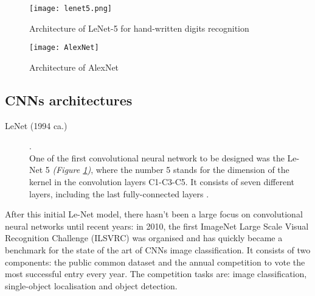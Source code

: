 \documentclass[../main.tex]{subfiles}
\begin{document}
\begin{figure}[!b]
  \centering
  \texttt{[image: lenet5.png]}
  \caption{Architecture of LeNet-5 for hand-written digits recognition \cite{LeCun1998}}
  \label{fig:lenet5}
\end{figure}

\begin{figure}[!b]
  \centering
  \texttt{[image: AlexNet]}
  \caption{Architecture of AlexNet \cite{Krizhevsky2012}}
  \label{fig:alexnet}
\end{figure}

\vspace{5mm}
\subsection{CNNs architectures}
\begin{description}
\item[LeNet (1994 ca.)] \cite{LeCun1998}. \hfill \\
One of the first convolutional neural network to be designed was the Le-Net 5 \textit{(Figure \ref{fig:lenet5})}, where the number 5 stands for the dimension of the kernel in the convolution layers C1-C3-C5. It consists of seven different layers, including the last fully-connected layers \cite{LeCun1998}. 
\end{description}
After this initial Le-Net model, there hasn't been a large focus on convolutional neural networks until recent years: in 2010, the first ImageNet Large Scale Visual Recognition Challenge (ILSVRC) was organised \cite{Russakovsky} and has quickly became a benchmark for the state of the art of CNNs image classification. It consists of two components: the public common dataset and the annual competition to vote the most successful entry every year. The competition tasks are: image classification, single-object localisation and object detection. \cite{Russakovsky}
\end{document}
